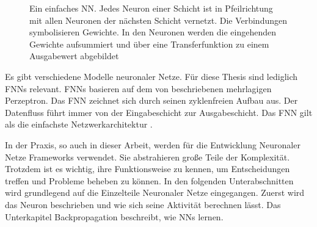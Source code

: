 \begin{figure}
  \centering
  \caption{Ein einfaches \acl{NN}. Jedes Neuron einer Schicht ist in Pfeilrichtung mit allen Neuronen der nächsten Schicht vernetzt. Die Verbindungen symbolisieren Gewichte. In den Neuronen werden die eingehenden Gewichte aufsummiert und über eine Transferfunktion zu einem Ausgabewert abgebildet}
  \label{fig:beispiel-nn}
\end{figure}

Es gibt verschiedene Modelle neuronaler Netze. Für diese Thesis sind lediglich \aclp{FNN} relevant. \acp{FNN} basieren auf dem von \citeauthor{rosenblatt1958perceptron} \cite{rosenblatt1958perceptron} beschriebenen mehrlagigen Perzeptron. Das \ac{FNN} zeichnet sich durch seinen zyklenfreien Aufbau aus. Der Datenfluss führt immer von der Eingabeschicht zur Ausgabeschicht. Das \ac{FNN} gilt als die einfachste Netzwerkarchitektur \cite{Schmidhuber2015}.

In der Praxis, so auch in dieser Arbeit, werden für die Entwicklung Neuronaler Netze Frameworks verwendet. Sie abstrahieren große Teile der Komplexität. Trotzdem ist es wichtig, ihre Funktionsweise zu kennen, um Entscheidungen treffen und Probleme beheben zu können. In den folgenden Unterabschnitten wird grundlegend auf die Einzelteile Neuronaler Netze eingegangen. Zuerst wird das Neuron beschrieben und wie sich seine Aktivität berechnen lässt. Das Unterkapitel Backpropagation beschreibt, wie \acp{NN} lernen.

